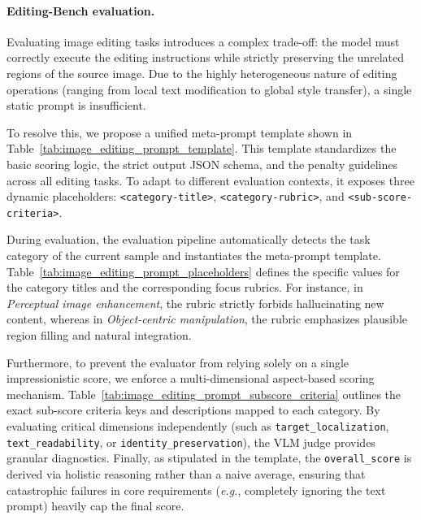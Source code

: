\documentclass{article}
\newcommand{\eg}{\emph{e.g.}}    %
\begin{document}
\paragraph{Editing-Bench evaluation.} 
Evaluating image editing tasks introduces a complex trade-off: the model must correctly execute the editing instructions while strictly preserving the unrelated regions of the source image. Due to the highly heterogeneous nature of editing operations (ranging from local text modification to global style transfer), a single static prompt is insufficient.

To resolve this, we propose a unified meta-prompt template shown in Table~\ref{tab:image_editing_prompt_template}. This template standardizes the basic scoring logic, the strict output JSON schema, and the penalty guidelines across all editing tasks. To adapt to different evaluation contexts, it exposes three dynamic placeholders: \texttt{<category-title>}, \texttt{<category-rubric>}, and \texttt{<sub-score-criteria>}.

During evaluation, the evaluation pipeline automatically detects the task category of the current sample and instantiates the meta-prompt template. Table~\ref{tab:image_editing_prompt_placeholders} defines the specific values for the category titles and the corresponding focus rubrics. For instance, in \textit{Perceptual image enhancement}, the rubric strictly forbids hallucinating new content, whereas in \textit{Object-centric manipulation}, the rubric emphasizes plausible region filling and natural integration.

Furthermore, to prevent the evaluator from relying solely on a single impressionistic score, we enforce a multi-dimensional aspect-based scoring mechanism. Table~\ref{tab:image_editing_prompt_subscore_criteria} outlines the exact sub-score criteria keys and descriptions mapped to each category. By evaluating critical dimensions independently (such as \texttt{target\_localization}, \texttt{text\_readability}, or \texttt{identity\_preservation}), the VLM judge provides granular diagnostics. Finally, as stipulated in the template, the \texttt{overall\_score} is derived via holistic reasoning rather than a naive average, ensuring that catastrophic failures in core requirements (\eg, completely ignoring the text prompt) heavily cap the final score.
\end{document}
